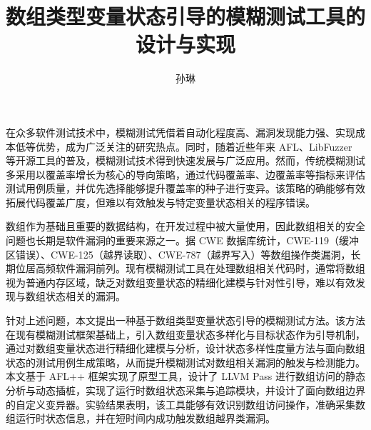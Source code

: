 \documentclass[bachelor]{njupthesis}
\title{数组类型变量状态引导的模糊测试工具的设计与实现}
\author{孙琳}
\begin{document}
\makecover

\begin{chineseabstract}
在众多软件测试技术中，模糊测试凭借着自动化程度高、漏洞发现能力强、实现成本低等优势，成为广泛关注的研究热点。同时，随着近些年来 AFL、LibFuzzer 等开源工具的普及，模糊测试技术得到快速发展与广泛应用。然而，传统模糊测试多采用以覆盖率增长为核心的导向策略，通过代码覆盖率、边覆盖率等指标来评估测试用例质量，并优先选择能够提升覆盖率的种子进行变异。该策略的确能够有效拓展代码覆盖广度，但难以有效触发与特定变量状态相关的程序错误。

数组作为基础且重要的数据结构，在开发过程中被大量使用，因此数组相关的安全问题也长期是软件漏洞的重要来源之一。据 CWE 数据库统计，CWE-119（缓冲区错误）、CWE-125（越界读取）、CWE-787（越界写入）等数组操作类漏洞，长期位居高频软件漏洞前列。现有模糊测试工具在处理数组相关代码时，通常将数组视为普通内存区域，缺乏对数组变量状态的精细化建模与针对性引导，难以有效发现与数组状态相关的漏洞。

针对上述问题，本文提出一种基于数组类型变量状态引导的模糊测试方法。该方法在现有模糊测试框架基础上，引入数组变量状态多样化与目标状态作为引导机制，通过对数组变量状态进行精细化建模与分析，设计状态多样性度量方法与面向数组状态的测试用例生成策略，从而提升模糊测试对数组相关漏洞的触发与检测能力。本文基于 AFL++ 框架实现了原型工具，设计了 LLVM Pass 进行数组访问的静态分析与动态插桩，实现了运行时数组状态采集与追踪模块，并设计了面向数组边界的自定义变异器。实验结果表明，该工具能够有效识别数组访问操作，准确采集数组运行时状态信息，并在短时间内成功触发数组越界类漏洞。

\end{chineseabstract}
\end{document}
